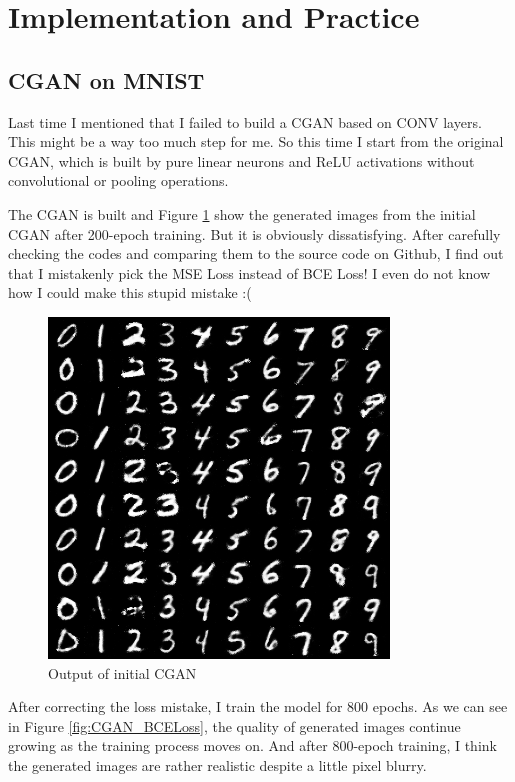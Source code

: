\documentclass{article} %
\begin{document}
\section{Implementation and Practice}

\subsection{CGAN on MNIST}

Last time I mentioned that I failed to build a CGAN based on CONV layers. This might be a way too much step for me. So this time I start from the original CGAN, which is built by pure linear neurons and ReLU activations without convolutional or pooling operations.

The CGAN is built and Figure \ref{fig:CGAN_MSELoss} show the generated images from the initial CGAN after 200-epoch training. But it is obviously dissatisfying. After carefully checking the codes and comparing them to the source code on Github, I find out that I mistakenly pick the MSE Loss instead of BCE Loss! I even do not know how I could make this stupid mistake :(

\begin{figure}[h]
	\centering
	\includegraphics[width=0.4\linewidth]{figures/CGAN_MSELoss.png}
	\caption{Output of initial CGAN}
	\label{fig:CGAN_MSELoss}
\end{figure}

After correcting the loss mistake, I train the model for 800 epochs. As we can see in Figure \ref{fig:CGAN_BCELoss}, the quality of generated images continue growing as the training process moves on. And after 800-epoch training, I think the generated images are rather realistic despite a little pixel blurry.
\end{document}
